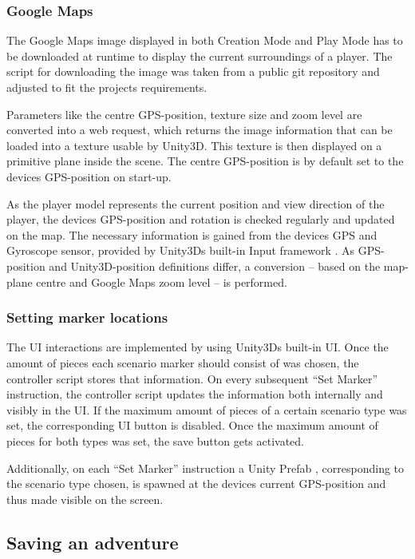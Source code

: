 \documentclass{sigchi-ext}
\begin{document}
\subsubsection{Google Maps}

The Google Maps image displayed in both Creation Mode and Play Mode has to be downloaded at runtime to display the current surroundings of a player. The script for downloading the image was taken from a public git repository \cite{googleMapsScript} and adjusted to fit the projects requirements.

Parameters like the centre GPS-position, texture size and zoom level are converted into a web request, which returns the image information that can be loaded into a texture usable by Unity3D. This texture is then displayed on a primitive plane inside the scene. The centre GPS-position is by default set to the devices GPS-position on start-up.

As the player model represents the current position and view direction of the player, the devices GPS-position and rotation is checked regularly and updated on the map. The necessary information is gained from the devices GPS and Gyroscope sensor, provided by Unity3Ds built-in Input framework \cite{unityInput}. As GPS-position and Unity3D-position definitions differ, a conversion -- based on the map-plane centre and Google Maps zoom level \cite{googleMapsZoomLevel} -- is performed.

\subsubsection{Setting marker locations}

The UI interactions are implemented by using Unity3Ds built-in UI. Once the amount of pieces each scenario marker should consist of was chosen, the controller script stores that information. On every subsequent ``Set Marker'' instruction, the controller script updates the information both internally and visibly in the UI. If the maximum amount of pieces of a certain scenario type was set, the corresponding UI button is disabled. Once the maximum amount of pieces for both types was set, the save button gets activated.

Additionally, on each ``Set Marker'' instruction a Unity Prefab \cite{unityPrefab}, corresponding to the scenario type chosen, is spawned at the devices current GPS-position and thus made visible on the screen. 

\subsection{Saving an adventure}
\end{document}
